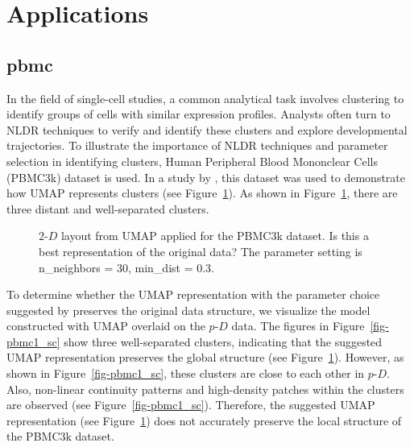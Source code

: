 \documentclass[
  12pt]{article}
\newcommand\pD{$p\text{-}D$}
\begin{document}
\section{Applications}\label{sec-applications}

\subsection{pbmc}\label{pbmc}

In the field of single-cell studies, a common analytical task involves
clustering to identify groups of cells with similar expression profiles.
Analysts often turn to NLDR techniques to verify and identify these
clusters and explore developmental trajectories. To illustrate the
importance of NLDR techniques and parameter selection in identifying
clusters, Human Peripheral Blood Mononclear Cells (PBMC3k) dataset
\citep{chen2023} is used. In a study by \citet{chen2023}, this dataset
was used to demonstrate how UMAP represents clusters (see
Figure~\ref{fig-umap-author}). As shown in Figure~\ref{fig-umap-author},
there are three distant and well-separated clusters.

\begin{figure}[H]


\caption{\label{fig-umap-author}\(2\text{-}D\) layout from UMAP applied
for the PBMC3k dataset. Is this a best representation of the original
data? The parameter setting is n\_neighbors = 30, min\_dist = 0.3.}

\end{figure}%

To determine whether the UMAP representation with the parameter choice
suggested by \citet{chen2023} preserves the original data structure, we
visualize the model constructed with UMAP overlaid on the \pD{} data.
The figures in Figure~\ref{fig-pbmc1_sc} show three well-separated
clusters, indicating that the suggested UMAP representation preserves
the global structure (see Figure~\ref{fig-umap-author}). However, as
shown in Figure~\ref{fig-pbmc1_sc}, these clusters are close to each
other in \pD{}. Also, non-linear continuity patterns and high-density
patches within the clusters are observed (see
Figure~\ref{fig-pbmc1_sc}). Therefore, the suggested UMAP representation
(see Figure~\ref{fig-umap-author}) does not accurately preserve the
local structure of the PBMC3k dataset.
\end{document}
